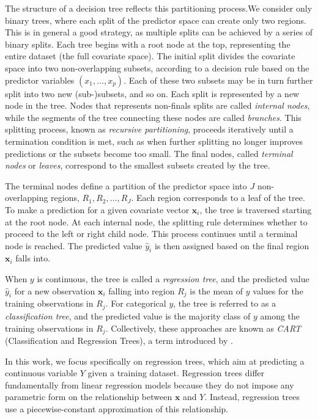 \documentclass[a4paper,11pt]{article}
\begin{document}
The structure of a decision tree reflects this partitioning process.We consider only binary trees, where each split of the predictor space can create only two regions. This is in general a good strategy, as multiple splits can be achieved by a series of binary splits. Each tree begins with a root node at the top, representing the entire dataset (the full covariate space). The initial split divides the covariate space into two non-overlapping subsets, according to a decision rule based on the predictor variables \( (x_1, \ldots, x_p) \). Each of these two subsets may be in turn further split into two new (sub-)subsets, and so on. Each split is represented by a new node in the tree. Nodes that represents non-finals splits are called \textit{internal nodes}, while the segments of the tree connecting these nodes are called \textit{branches}. This splitting process, known as \textit{recursive partitioning}, proceeds iteratively until a termination condition is met, such as when further splitting no longer improves predictions or the subsets become too small. The final nodes, called \textit{terminal nodes} or \textit{leaves}, correspond to the smallest subsets created by the tree.

The terminal nodes define a partition of the predictor space into \( J \) non-overlapping regions, \( R_1, R_2, \ldots, R_J \). Each region corresponds to a leaf of the tree. To make a prediction for a given covariate vector \( \mathbf{x}_i \), the tree is traversed starting at the root node. At each internal node, the splitting rule determines whether to proceed to the left or right child node. This process continues until a terminal node is reached. The predicted value \( \hat{y}_i \) is then assigned based on the final region \( \mathbf{x}_i \) falls into.

When \( y \) is continuous, the tree is called a \textit{regression tree}, and the predicted value \( \hat{y}_i \) for a new observation \( \mathbf{x}_i \) falling into region \( R_j \) is the mean of \( y \) values for the training observations in \( R_j \). For categorical \( y \), the tree is referred to as a \textit{classification tree}, and the predicted value is the majority class of \( y \) among the training observations in \( R_j \). Collectively, these approaches are known as \textit{CART} (Classification and Regression Trees), a term introduced by \cite{Gordon_Breiman_Friedman_Olshen_Stone_1984}.

In this work, we focus specifically on regression trees, which aim at predicting a continuous variable \( Y \) given a training dataset. Regression trees differ fundamentally from linear regression models because they do not impose any parametric form on the relationship between \( \mathbf{x} \) and \( Y \). Instead, regression trees use a piecewise-constant approximation of this relationship.
\end{document}
